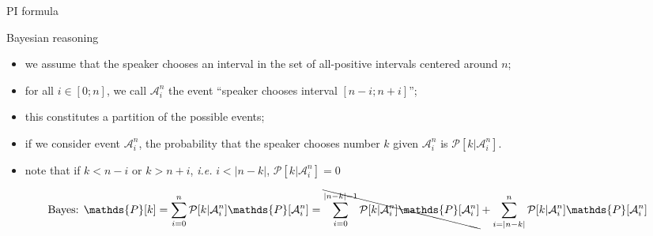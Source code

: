 \documentclass[xcolor=table, hyperref={pdfpagelabels=false}]{beamer}
\begin{document}
\begin{frame}{PI formula}
\begin{block}{Bayesian reasoning}
	\begin{itemize}
		\item we assume that the speaker chooses an interval in the set of all-positive intervals centered around $n$;
		\item for all $i \in [0; n]$, we call $\mathcal{A}^n_i$ the event ``speaker chooses interval $[n-i; n+i]$'';
		\item this constitutes a partition of the possible events;
		\item if we consider event $\mathcal{A}^n_i$, the probability that the speaker chooses number $k$ given $\mathcal{A}^n_i$ is $\mathcal{P}[k|\mathcal{A}^n_i]$.
		\item note that if $k < n-i$ or $k > n+i$, \textit{i.e.} $i < |n-k|$, $\mathcal{P}[k|\mathcal{A}^n_i] = 0$
	\end{itemize}
\end{block}
\tiny
\begin{equation*}
\mbox{\begin{normalsize}
	Bayes: 
	\end{normalsize}} \mathds{P}[k] = \sum_{i = 0}^n \mathcal{P}[k|\mathcal{A}^n_i] \mathds{P}[\mathcal{A}^n_i] = \bcancel{\sum_{i = 0}^{|n-k|-1} \mathcal{P}[k|\mathcal{A}^n_i] \mathds{P}[\mathcal{A}^n_i]}+\sum_{i = |n-k|}^n \mathcal{P}[k|\mathcal{A}^n_i] \mathds{P}[\mathcal{A}^n_i]
\end{equation*}
\end{frame}
\end{document}
